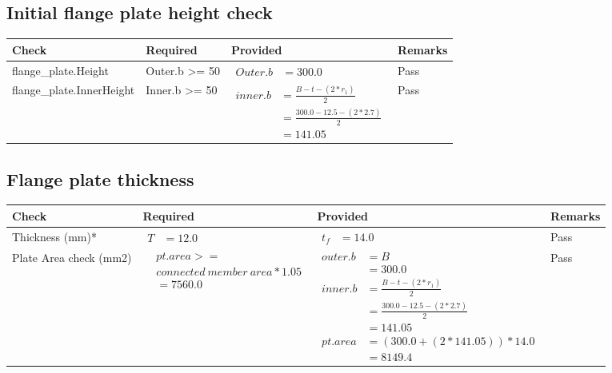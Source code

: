 \documentclass{article}%
\begin{document}
%
\newpage%
\subsection{Initial flange plate height check}%
\label{subsec:Initialflangeplateheightcheck}%
\renewcommand{\arraystretch}{1.2}%
\begin{longtable}{|p{4.5cm}|p{2.5cm}|p{7cm}|p{1.5cm}|}%
\hline%
\rowcolor{OsdagGreen}%
Check&Required&Provided&Remarks\\%
\hline%
\endhead%
\hline%
flange\_plate.Height&Outer.b >= 50&$\begin{aligned} Outer.b &=300.0\end{aligned}$&Pass\\%
\hline%
flange\_plate.InnerHeight&Inner.b >= 50&$\begin{aligned} inner.b &= \frac{B-t-(2*r_1)}{2}\\ &=\frac{300.0-12.5-(2*2.7)}{2}\\ &= 141.05\end{aligned}$&Pass\\%
\hline%
\end{longtable}

%
\newpage%
\subsection{Flange plate thickness}%
\label{subsec:Flangeplatethickness}%
\renewcommand{\arraystretch}{1.2}%
\begin{longtable}{|p{2.5cm}|p{4.5cm}|p{7cm}|p{1.5cm}|}%
\hline%
\rowcolor{OsdagGreen}%
Check&Required&Provided&Remarks\\%
\hline%
\endhead%
\hline%
Thickness (mm)*&$\begin{aligned} T &=12.0\end{aligned}$&$\begin{aligned} t_f &=14.0\end{aligned}$&Pass\\%
\hline%
Plate Area check (mm2)&$\begin{aligned} &pt.area >= \\&connected~member~area * 1.05\\  &= 7560.0\end{aligned}$&$\begin{aligned} outer.b &= B\\ &= 300.0 \\ inner.b &= \frac{B-t-(2*r_1)}{2}\\ &=\frac{300.0-12.5-(2*2.7)}{2}\\ &= 141.05 \\  pt.area &=(300.0+(2*141.05))*14.0\\ &= 8149.4\end{aligned}$&Pass\\%
\hline%
\end{longtable}
\end{document}
